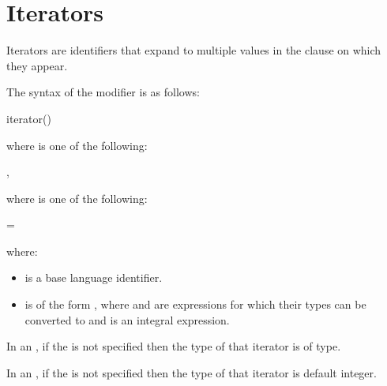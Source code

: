 \section{Iterators}
\label{sec:iterators}

Iterators are identifiers that expand to multiple values in the clause on which 
they appear.

The syntax of the  modifier is as follows:
\begin{ompSyntax}
iterator()
\end{ompSyntax}

where  is one of the following:
\begin{indentedcodelist}
\plc{iterator-specifier [}, \plc{iterators-definition ]}
\end{indentedcodelist}

where  is one of the following:
\begin{indentedcodelist}
  = 
\end{indentedcodelist}

where:
\begin{itemize}
\item {} is a base language identifier.


\item {} is of the form 
\code{:}\plc{end[}\code{:}\plc{step]}, where  and 
 are expressions for which their types can be converted to 
 and  is an integral expression.
\end{itemize}

\begin{ccppspecific}
In an , if the  is not specified then the type of that iterator is of  type.
\end{ccppspecific}

\begin{fortranspecific}
In an , if the  is not specified then the type of that iterator is default integer.
\end{fortranspecific}

